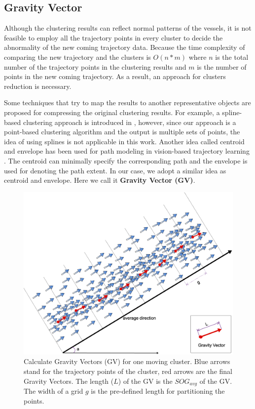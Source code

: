 \documentclass[12pt,glossary]{dalcsthesis}
\begin{document}
\subsection{Gravity Vector}
\label{subsec:gv}

Although the clustering results can reflect normal patterns of the vessels, it is not feasible to employ all the trajectory points in every cluster to decide the abnormality of the new coming trajectory data. Because the time complexity of comparing the new trajectory and the clusters is $O(n*m)$ where $n$ is the total number of the trajectory points in the clustering results and $m$ is the number of points in the new coming trajectory. As a result, an approach for clusters reduction is necessary.

Some techniques \cite{spline}\cite{visionsurvey} that try to map the results to another representative objects are proposed for compressing the original clustering results. For example, a spline-based clustering approach is introduced in \cite{spline}, however, since our approach is a point-based clustering algorithm and the output is multiple sets of points, the idea of using splines is not applicable in this work. Another idea called centroid and envelope has been used for path modeling in vision-based trajectory learning \cite{visionsurvey}. The centroid can minimally specify the corresponding path and the envelope is used for denoting the path extent. In our case, we adopt a similar idea as centroid and envelope. Here we call it \textbf{Gravity Vector (GV)}. 


\begin{figure}[!htb]
\centering
\includegraphics[width=6in]{gravityCalculation.png}%
\caption{Calculate Gravity Vectors (GV) for one moving cluster. Blue arrows stand for the trajectory points of the cluster, red arrows are the final Gravity Vectors. The length ($L$) of the GV is the $SOG_{avg}$ of the GV. The width of a grid $g$ is the pre-defined length for partitioning the points.}
\label{fig:gravityPoint}
\end{figure}
\end{document}
